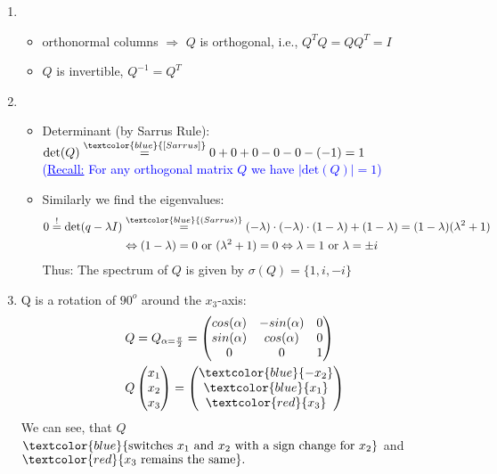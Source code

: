 {
\color{solution}
\begin{enumerate}
	\item 
	\begin{itemize}
		\item 
		orthonormal columns $\Rightarrow$ $Q$ is orthogonal, i.e., $Q^TQ = QQ^T = I$
		\item 
		$Q$ is invertible, $Q^{-1}=Q^T$
	\end{itemize}
	\item 
	\begin{itemize}
		\item 
		Determinant (by Sarrus Rule): $\text{det}(Q) \stackrel{\textcolor{blue}{[Sarrus]}}{=} 0+0+0-0-0-(-1) = 1$\\
		\textcolor{blue}{(\underline{Recall:} For any orthogonal matrix $Q$ we have $|\text{det}(Q)| = 1$)}
		\item 
		Similarly we find the eigenvalues:
		\begin{align*} 
		0 \stackrel{!}{=} \text{det}(q-\lambda I)& \stackrel{\textcolor{blue}{(Sarrus)}}{=} (-\lambda)\cdot(-\lambda)\cdot(1-\lambda) + (1-\lambda) = (1-\lambda)(\lambda^2+1)\\
		&\Leftrightarrow (1-\lambda)=0\ \text{or}\ (\lambda^2+1)=0\Leftrightarrow \lambda=1\ \text{or}\ \lambda = \pm i
		\end{align*}
		Thus: The spectrum of $Q$ is given by $\sigma(Q)=\{1,i,-i\}$
	\end{itemize}
	\item 
	Q is a rotation of $90^o$ around the $x_3$-axis:
	\begin{align*} 
	& Q = Q_{\alpha = \frac{\pi}{2}} 
	= \begin{pmatrix} cos(\alpha)&-sin(\alpha)&0\\sin(\alpha)&cos(\alpha)&0\\0&0&1\end{pmatrix}\\
	&Q\begin{pmatrix}x_1\\x_2\\x_3\end{pmatrix} 
	= \begin{pmatrix}\textcolor{blue}{-x_2}\\\textcolor{blue}{x_1}\\\textcolor{red}{x_3}\end{pmatrix}
	\end{align*}
	We can see, that $Q$ $\textcolor{blue}{\text{switches}~x_1~\text{and}~x_2~\text{with a sign change for}~x_2}$ and $\textcolor{red}{x_3~\text{remains the same}}.$
\end{enumerate}

}